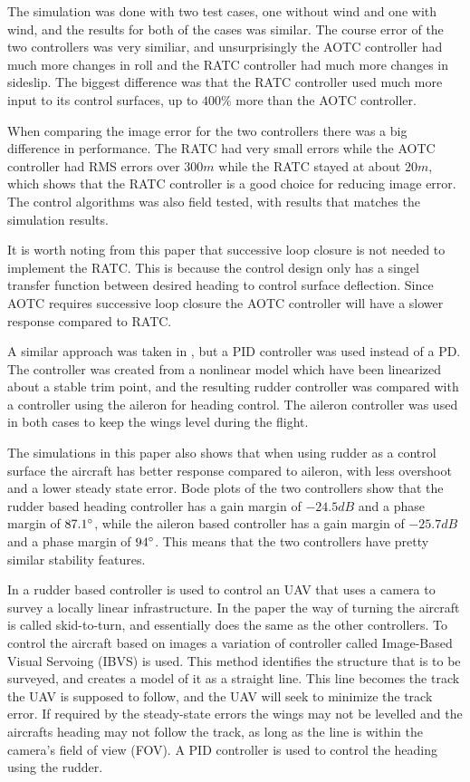 The simulation was done with two test cases, one without wind and one with wind, and the results for both of the cases was similar. The course error of the two controllers was very similiar, and unsurprisingly the AOTC controller had much more changes in roll and the RATC controller had much more changes in sideslip. The biggest difference was that the RATC controller used much more input to its control surfaces, up to $400 \%$ more than the AOTC controller.

When comparing the image error for the two controllers there was a big difference in performance. The RATC had very small errors while the AOTC controller had RMS errors over $300 m$ while the RATC stayed at about $20 m$, which shows that the RATC controller is a good choice for reducing image error. The control algorithms was also field tested, with results that matches the simulation results.

It is worth noting from this paper that successive loop closure is not needed to implement the RATC. This is because the control design only has a singel transfer function between desired heading to control surface deflection. Since AOTC requires successive loop closure the AOTC controller will have a slower response compared to RATC.

A similar approach was taken in \cite{alternateSurfaceAhsan}, but a PID controller was used instead of a PD. The controller was created from a nonlinear model which have been linearized about a stable trim point, and the resulting rudder controller was compared with a controller using the aileron for heading control. The aileron controller was used in both cases to keep the wings level during the flight.

The simulations in this paper also shows that when using rudder as a control surface the aircraft has better response compared to aileron, with less overshoot and a lower steady state error. Bode plots of the two controllers show that the rudder based heading controller has a gain margin of $-24.5 dB$ and a phase margin of $87.1 \degree$, while the aileron based controller has a gain margin of $-25.7 dB$ and a phase margin of $94 \degree$. This means that the two controllers have pretty similar stability features.

In \cite{skidToTurnMills} a rudder based controller is used to control an UAV that uses a camera to survey a locally linear infrastructure. In the paper the way of turning the aircraft is called skid-to-turn, and essentially does the same as the other controllers. To control the aircraft based on images a variation of controller called Image-Based Visual Servoing (IBVS) is used. This method identifies the structure that is to be surveyed, and creates a model of it as a straight line. This line becomes the track the UAV is supposed to follow, and the UAV will seek to minimize the track error. If required by the steady-state errors the wings may not be levelled and the aircrafts heading may not follow the track, as long as the line is within the camera's field of view (FOV). A PID controller is used to control the heading using the rudder.

